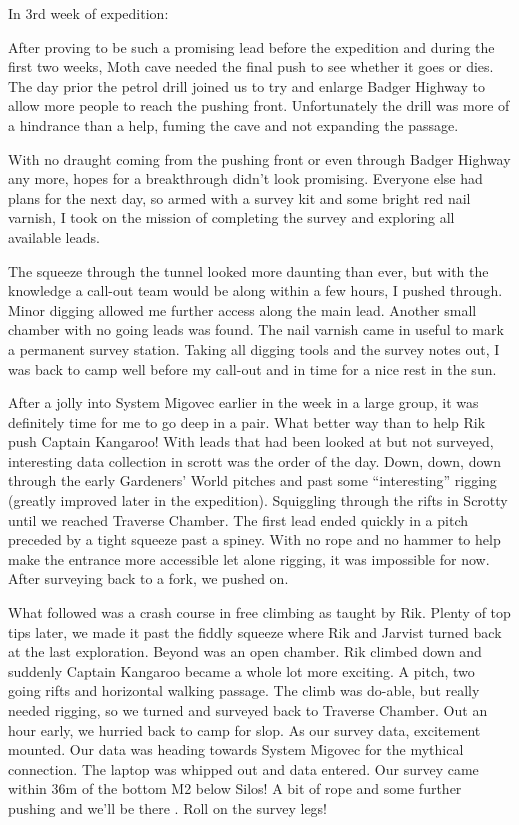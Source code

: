 In 3rd week of expedition:

After proving to be such a promising lead before the expedition and
during the first two weeks, Moth cave needed the final push to see
whether it goes or dies. The day prior the petrol drill joined us to try
and enlarge Badger Highway to allow more people to reach the pushing
front. Unfortunately the drill was more of a hindrance than a help,
fuming the cave and not expanding the passage.

With no draught coming from the pushing front or even through Badger
Highway any more, hopes for a breakthrough didn't look promising.
Everyone else had plans for the next day, so armed with a survey kit and
some bright red nail varnish, I took on the mission of completing the
survey and exploring all available leads.

The squeeze through the tunnel looked more daunting than ever, but with
the knowledge a call-out team would be along within a few hours, I
pushed through. Minor digging allowed me further access along the main
lead. Another small chamber with no going leads was found. The nail
varnish came in useful to mark a permanent survey station. Taking all
digging tools and the survey notes out, I was back to camp well before
my call-out and in time for a nice rest in the sun.

After a jolly into System Migovec earlier in the week in a large group,
it was definitely time for me to go deep in a pair. What better way than
to help Rik push Captain Kangaroo! With leads that had been looked at
but not surveyed, interesting data collection in scrott was the order of
the day. Down, down, down through the early Gardeners' World pitches and
past some ``interesting'' rigging (greatly improved later in the
expedition). Squiggling through the rifts in Scrotty until we reached
Traverse Chamber. The first lead ended quickly in a pitch preceded by a
tight squeeze past a spiney. With no rope and no hammer to help make the
entrance more accessible let alone rigging, it was impossible for now.
After surveying back to a fork, we pushed on.

What followed was a crash course in free climbing as taught by Rik.
Plenty of top tips later, we made it past the fiddly squeeze where Rik
and Jarvist turned back at the last exploration. Beyond was an open
chamber. Rik climbed down and suddenly Captain Kangaroo became a whole
lot more exciting. A pitch, two going rifts and horizontal walking
passage. The climb was do-able, but really needed rigging, so we turned
and surveyed back to Traverse Chamber. Out an hour early, we hurried
back to camp for slop. As our survey data, excitement mounted. Our data
was heading towards System Migovec for the mythical connection. The
laptop was whipped out and data entered. Our survey came within 36m of
the bottom M2 below Silos! A bit of rope and some further pushing and
we'll be there . Roll on the survey legs!

